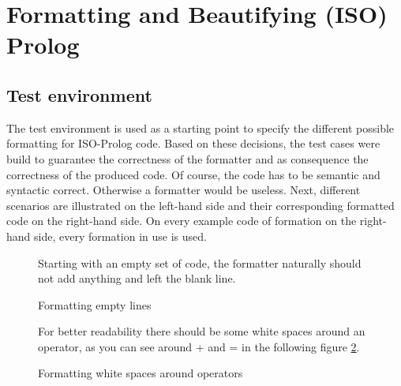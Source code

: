\documentclass{article}
\begin{document}
 
\section{Formatting and Beautifying (ISO) Prolog} 
 \subsection{Test environment}
 The test environment is used as a starting point to specify the different possible formatting for ISO-Prolog code. Based on these decisions, the test cases were build to guarantee the correctness of the formatter and as consequence the correctness of the produced code. Of course, the code has to be semantic and syntactic correct. Otherwise a formatter would be useless. Next, different scenarios are illustrated on the left-hand side and their corresponding formatted code on the right-hand side. On every example code of formation on the right-hand side, every formation in use is used.
 
 
\begin{figure}[h]
Starting with an empty set of code, the formatter naturally should not add anything and left the blank line.\\

\begin{minipage}{.5\textwidth}

\end{minipage}
\hfill
\begin{minipage}{.5\textwidth}

\end{minipage}

\caption{Formatting empty lines}
\label{lst:empyt}
\end{figure}

 
\begin{figure}[h]
For better readability there should be some white spaces around an operator, as you can see around + and = in the following figure \ref{lst:operatorWhitespaces}.\\

\begin{minipage}{.5\textwidth}

\end{minipage}
\hfill
\begin{minipage}{.5\textwidth}

\end{minipage}

\caption{Formatting white spaces around operators}
\label{lst:operatorWhitespaces}
\end{figure}
 
\end{document}
